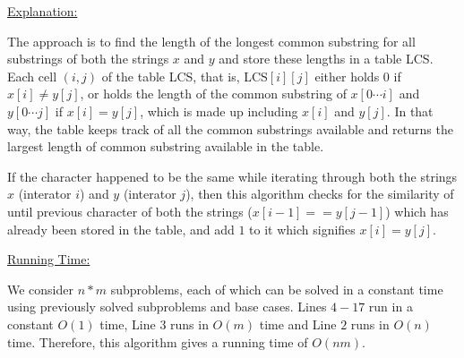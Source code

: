 \documentclass[letterpaper,11pt]{article}
\begin{document}
\underline{Explanation:}

The approach is to find the length of the longest common substring for all substrings of both the strings $x$ and $y$ and store these lengths in a table LCS. Each cell $(i,j)$ of the table LCS, that is, LCS$[i][j]$ either holds $0$ if $x[i] \neq y[j]$, or holds the length of the common substring of $x[0 \cdots i]$ and $y[0 \cdots j]$ if $x[i] = y[j]$, which is made up including $x[i]$ and $y[j]$. In that way, the table keeps track of all the common substrings available and returns the largest length of common substring available in the table.

If the character happened to be the same while iterating through both the strings $x$ (interator $i$) and $y$ (interator $j$), then this algorithm checks for the similarity of until previous character of both the strings ($x[i-1] == y[j-1]$) which has already been stored in the table, and add $1$ to it which signifies $x[i] = y[j]$.

\underline{Running Time:}

We consider $n*m$ subproblems, each of which can be solved in a constant time using previously solved subproblems and base cases. Lines $4-17$ run in a constant $O(1)$ time, Line $3$ runs in $O(m)$ time and Line $2$ runs in $O(n)$ time. Therefore, this algorithm gives a running time of $O(nm)$.
\end{document}

